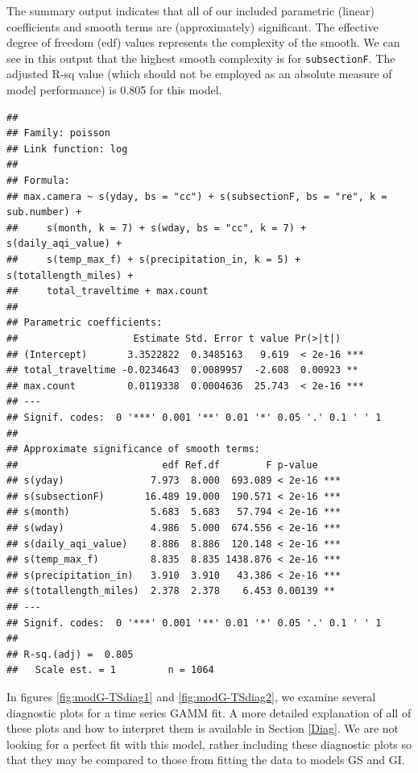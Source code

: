 \documentclass[
]{book}
\newenvironment{Shaded}{\begin{snugshade}}{\end{snugshade}}
\newcommand{\FunctionTok}[1]{\textcolor[rgb]{0.00,0.00,0.00}{#1}}
\newcommand{\NormalTok}[1]{#1}
\newcommand{\SpecialCharTok}[1]{\textcolor[rgb]{0.00,0.00,0.00}{#1}}
\begin{document}
The summary output indicates that all of our included parametric (linear) coefficients and smooth terms are (approximately) significant. The effective degree of freedom (edf) values represents the complexity of the smooth. We can see in this output that the highest smooth complexity is for \texttt{subsectionF}. The adjusted R-sq value (which should not be employed as an absolute measure of model performance) is 0.805 for this model.

\begin{Shaded}
\end{Shaded}

\begin{verbatim}
## 
## Family: poisson 
## Link function: log 
## 
## Formula:
## max.camera ~ s(yday, bs = "cc") + s(subsectionF, bs = "re", k = sub.number) + 
##     s(month, k = 7) + s(wday, bs = "cc", k = 7) + s(daily_aqi_value) + 
##     s(temp_max_f) + s(precipitation_in, k = 5) + s(totallength_miles) + 
##     total_traveltime + max.count
## 
## Parametric coefficients:
##                    Estimate Std. Error t value Pr(>|t|)    
## (Intercept)       3.3522822  0.3485163   9.619  < 2e-16 ***
## total_traveltime -0.0234643  0.0089957  -2.608  0.00923 ** 
## max.count         0.0119338  0.0004636  25.743  < 2e-16 ***
## ---
## Signif. codes:  0 '***' 0.001 '**' 0.01 '*' 0.05 '.' 0.1 ' ' 1
## 
## Approximate significance of smooth terms:
##                         edf Ref.df        F p-value    
## s(yday)               7.973  8.000  693.089 < 2e-16 ***
## s(subsectionF)       16.489 19.000  190.571 < 2e-16 ***
## s(month)              5.683  5.683   57.794 < 2e-16 ***
## s(wday)               4.986  5.000  674.556 < 2e-16 ***
## s(daily_aqi_value)    8.886  8.886  120.148 < 2e-16 ***
## s(temp_max_f)         8.835  8.835 1438.876 < 2e-16 ***
## s(precipitation_in)   3.910  3.910   43.386 < 2e-16 ***
## s(totallength_miles)  2.378  2.378    6.453 0.00139 ** 
## ---
## Signif. codes:  0 '***' 0.001 '**' 0.01 '*' 0.05 '.' 0.1 ' ' 1
## 
## R-sq.(adj) =  0.805   
##   Scale est. = 1         n = 1064
\end{verbatim}

In figures \ref{fig:modG-TSdiag1} and \ref{fig:modG-TSdiag2}, we examine several diagnostic plots for a time series GAMM fit. A more detailed explanation of all of these plots and how to interpret them is available in Section \ref{Diag}. We are not looking for a perfect fit with this model, rather including these diagnostic plots so that they may be compared to those from fitting the data to models GS and GI.
\end{document}
